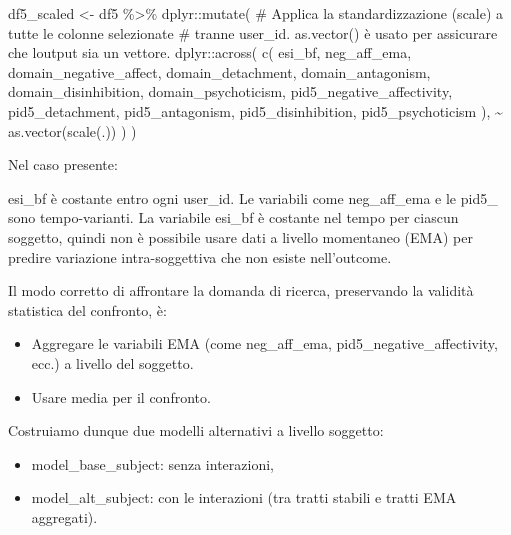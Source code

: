 \documentclass[
  11pt,
  a4paper,
  onecolumn]{article}
\newenvironment{Shaded}{}{}
\newcommand{\CommentTok}[1]{\textcolor[rgb]{0.42,0.45,0.49}{#1}}
\newcommand{\FunctionTok}[1]{\textcolor[rgb]{0.44,0.26,0.76}{#1}}
\newcommand{\NormalTok}[1]{\textcolor[rgb]{0.14,0.16,0.18}{#1}}
\newcommand{\OtherTok}[1]{\textcolor[rgb]{0.44,0.26,0.76}{#1}}
\newcommand{\SpecialCharTok}[1]{\textcolor[rgb]{0.00,0.36,0.77}{#1}}
\providecommand{\tightlist}{%
  \setlength{\itemsep}{0pt}\setlength{\parskip}{0pt}}
\begin{document}
\begin{Shaded}
\begin{Highlighting}[]
\NormalTok{df5\_scaled }\OtherTok{\textless{}{-}}\NormalTok{ df5 }\SpecialCharTok{\%\textgreater{}\%}
\NormalTok{  dplyr}\SpecialCharTok{::}\FunctionTok{mutate}\NormalTok{(}
    \CommentTok{\# Applica la standardizzazione (scale) a tutte le colonne selezionate}
    \CommentTok{\# tranne user\_id. as.vector() è usato per assicurare che l\textquotesingle{}output sia un vettore.}
\NormalTok{    dplyr}\SpecialCharTok{::}\FunctionTok{across}\NormalTok{(}
      \FunctionTok{c}\NormalTok{(}
\NormalTok{        esi\_bf,}
\NormalTok{        neg\_aff\_ema, }
\NormalTok{        domain\_negative\_affect,   }
\NormalTok{        domain\_detachment,}
\NormalTok{        domain\_antagonism,}
\NormalTok{        domain\_disinhibition,}
\NormalTok{        domain\_psychoticism,}
\NormalTok{        pid5\_negative\_affectivity,}
\NormalTok{        pid5\_detachment,}
\NormalTok{        pid5\_antagonism,}
\NormalTok{        pid5\_disinhibition,}
\NormalTok{        pid5\_psychoticism}
\NormalTok{      ),}
      \SpecialCharTok{\textasciitilde{}} \FunctionTok{as.vector}\NormalTok{(}\FunctionTok{scale}\NormalTok{(.))}
\NormalTok{    )}
\NormalTok{  )}
\end{Highlighting}
\end{Shaded}

Nel caso presente:

esi\_bf è costante entro ogni user\_id. Le variabili come neg\_aff\_ema
e le pid5\_ sono tempo-varianti. La variabile esi\_bf è costante nel
tempo per ciascun soggetto, quindi non è possibile usare dati a livello
momentaneo (EMA) per predire variazione intra-soggettiva che non esiste
nell'outcome.

Il modo corretto di affrontare la domanda di ricerca, preservando la
validità statistica del confronto, è:

\begin{itemize}
\tightlist
\item
  Aggregare le variabili EMA (come neg\_aff\_ema,
  pid5\_negative\_affectivity, ecc.) a livello del soggetto.
\item
  Usare media per il confronto.
\end{itemize}

Costruiamo dunque due modelli alternativi a livello soggetto:

\begin{itemize}
\tightlist
\item
  model\_base\_subject: senza interazioni,
\item
  model\_alt\_subject: con le interazioni (tra tratti stabili e tratti
  EMA aggregati).
\end{itemize}
\end{document}
